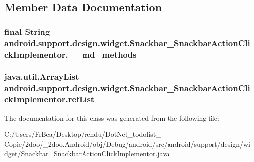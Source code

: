 \subsection{Member Data Documentation}
\hypertarget{classandroid_1_1support_1_1design_1_1widget_1_1_snackbar___snackbar_action_click_implementor_ad3fa0ac0be924f89fc03341fb991061}{
\subsubsection[{\_\-\_\-md\_\-methods}]{\setlength{\rightskip}{0pt plus 5cm}final String {\bf android.support.design.widget.Snackbar\_\-SnackbarActionClickImplementor.\_\-\_\-md\_\-methods}}}
\label{classandroid_1_1support_1_1design_1_1widget_1_1_snackbar___snackbar_action_click_implementor_ad3fa0ac0be924f89fc03341fb991061}


\hypertarget{classandroid_1_1support_1_1design_1_1widget_1_1_snackbar___snackbar_action_click_implementor_2c212a55ca2a8eb41a261abf32790343}{
\subsubsection[{refList}]{\setlength{\rightskip}{0pt plus 5cm}java.util.ArrayList {\bf android.support.design.widget.Snackbar\_\-SnackbarActionClickImplementor.refList}}}
\label{classandroid_1_1support_1_1design_1_1widget_1_1_snackbar___snackbar_action_click_implementor_2c212a55ca2a8eb41a261abf32790343}




The documentation for this class was generated from the following file:\begin{CompactItemize}
\item 
C:/Users/FrBea/Desktop/rendu/DotNet\_\-todolist\_ - Copie/2doo/\_\-2doo.Android/obj/Debug/android/src/android/support/design/widget/\hyperlink{_snackbar___snackbar_action_click_implementor_8java}{Snackbar\_\-SnackbarActionClickImplementor.java}\end{CompactItemize}
